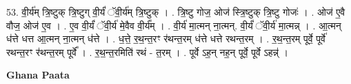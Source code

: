 \documentclass[17pt]{extarticle}
\begin{document}
53. वी॒र्य॑म् त्रि॒ष्टुक् त्रि॒ष्टुग् वी॒र्यं॑ ॅवी॒र्य॑म् त्रि॒ष्टुक् । . त्रि॒ष्टु गोज॒ ओज॑ स्त्रि॒ष्टुक् त्रि॒ष्टु गोजः॑ । . ओज॑ ए॒वै वौज॒ ओज॑ ए॒व । . ए॒व वी॒र्यं॑ ॅवी॒र्य॑ मे॒वैव वी॒र्य᳚म् । . वी॒र्य॑ मा॒त्मन् ना॒त्मन्. वी॒र्यं॑ ॅवी॒र्य॑ मा॒त्मन्न् । . आ॒त्मन् ध॑त्ते धत्त आ॒त्मन् ना॒त्मन् ध॑त्ते । . ध॒त्ते॒ र॒थ॒न्त॒रꣳ र॑थन्त॒रम् ध॑त्ते धत्ते रथन्त॒रम् । . र॒थ॒न्त॒रम् पूर्वे॒ पूर्वे॑ रथन्त॒रꣳ र॑थन्त॒रम् पूर्वे᳚ । . र॒थ॒न्त॒रमिति॑ रथं - त॒रम् । . पूर्वे ऽह॒न् नह॒न् पूर्वे॒ पूर्वे ऽहन्न्॑ । \newline

\textbf{Ghana Paata } \newline
\end{document}
